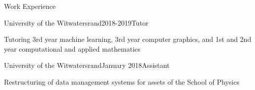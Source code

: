 \documentclass{resume} %
\begin{document}

\begin{rSection}{Work Experience}
\begin{rSubsection}{University of the Witwatersrand}{2018-2019}{Tutor}{}
\item Tutoring 3rd year machine learning, 3rd year computer graphics, and 1st and 2nd year computational and applied mathematics
\end{rSubsection}
\begin{rSubsection}{University of the Witwatersrand}{January 2018}{Assistant}{}
\item Restructuring of data management systems for assets of the School of Physics
\end{rSubsection}


\end{rSection}


\end{document}
